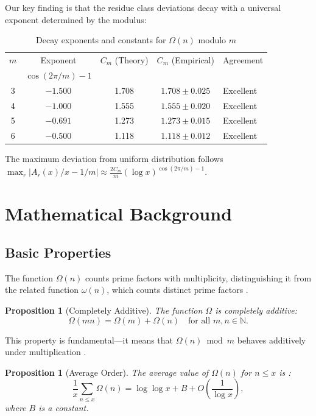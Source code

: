 \documentclass[12pt]{article}
\newtheorem{proposition}[theorem]{Proposition}
\theoremstyle{definition}
\theoremstyle{remark}
\begin{document}
Our key finding is that the residue class deviations decay with a universal exponent determined by the modulus:

\begin{table}[ht]
\centering
\caption{Decay exponents and constants for $\Omega(n)$ modulo $m$}
\label{tab:main_summary}
\begin{tabular}{@{}ccccl@{}}
\toprule
$m$ & Exponent & $C_m$ (Theory) & $C_m$ (Empirical) & Agreement \\
    & $\cos(2\pi/m) - 1$ & & & \\
\midrule
3 & $-1.500$ & 1.708 & $1.708 \pm 0.025$ & Excellent \\
4 & $-1.000$ & 1.555 & $1.555 \pm 0.020$ & Excellent \\
5 & $-0.691$ & 1.273 & $1.273 \pm 0.015$ & Excellent \\
6 & $-0.500$ & 1.118 & $1.118 \pm 0.012$ & Excellent \\
\bottomrule
\end{tabular}
\end{table}

The maximum deviation from uniform distribution follows $\max_r |A_r(x)/x - 1/m| \approx \frac{2C_m}{m}(\log x)^{\cos(2\pi/m) - 1}$.

\section{Mathematical Background}

\subsection{Basic Properties}

The function $\Omega(n)$ counts prime factors with multiplicity, distinguishing it from the related function $\omega(n)$, which counts distinct prime factors \cite{hardy2008introduction}.

\begin{proposition}[Completely Additive]
The function $\Omega$ is completely additive:
\[
\Omega(mn) = \Omega(m) + \Omega(n) \quad \text{for all } m, n \in \mathbb{N}.
\]
\end{proposition}

This property is fundamental---it means that $\Omega(n) \bmod m$ behaves additively under multiplication \cite{apostol1976introduction}.

\begin{proposition}[Average Order]
The average value of $\Omega(n)$ for $n \leq x$ is \cite{tenenbaum2015introduction}:
\[
\frac{1}{x} \sum_{n \leq x} \Omega(n) = \log \log x + B + O\left(\frac{1}{\log x}\right),
\]
where $B$ is a constant.
\end{proposition}
\end{document}
